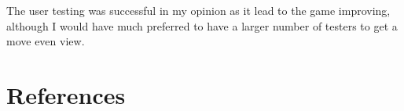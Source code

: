 \documentclass{article}
\begin{document}
The user testing was successful in my opinion as it lead to the game improving, although I would have much preferred to have a larger number of testers to get a move even view.

\newpage
\section{References}

\end{document}
